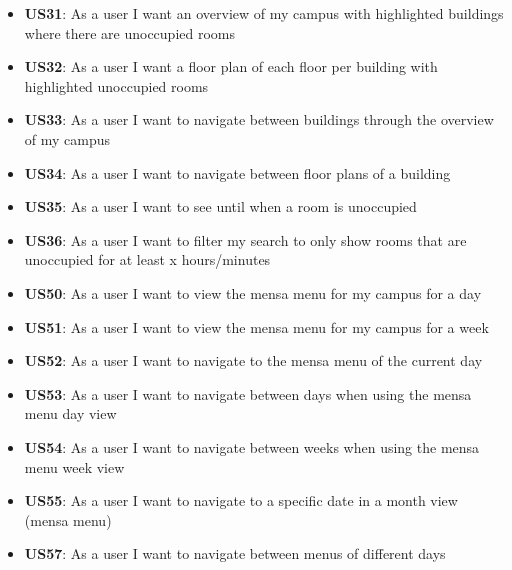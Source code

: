 \begin{markdown}
\begin{itemize}
  \item \textbf{US31}: As a user I want an overview of my campus with highlighted buildings where there are unoccupied rooms
  \item \textbf{US32}: As a user I want a floor plan of each floor per building with highlighted unoccupied rooms
  \item \textbf{US33}: As a user I want to navigate between buildings through the overview of my campus
  \item \textbf{US34}: As a user I want to navigate between floor plans of a building
  \item \textbf{US35}: As a user I want to see until when a room is unoccupied
  \item \textbf{US36}: As a user I want to filter my search to only show rooms that are unoccupied for at least x hours/minutes
  \item \textbf{US50}: As a user I want to view the mensa menu for my campus for a day
  \item \textbf{US51}: As a user I want to view the mensa menu for my campus for a week
  \item \textbf{US52}: As a user I want to navigate to the mensa menu of the current day
  \item \textbf{US53}: As a user I want to navigate between days when using the mensa menu day view
  \item \textbf{US54}: As a user I want to navigate between weeks when using the mensa menu week view
  \item \textbf{US55}: As a user I want to navigate to a specific date in a month view (mensa menu)
  \item \textbf{US57}: As a user I want to navigate between menus of different days
\end{itemize}

\end{markdown}
